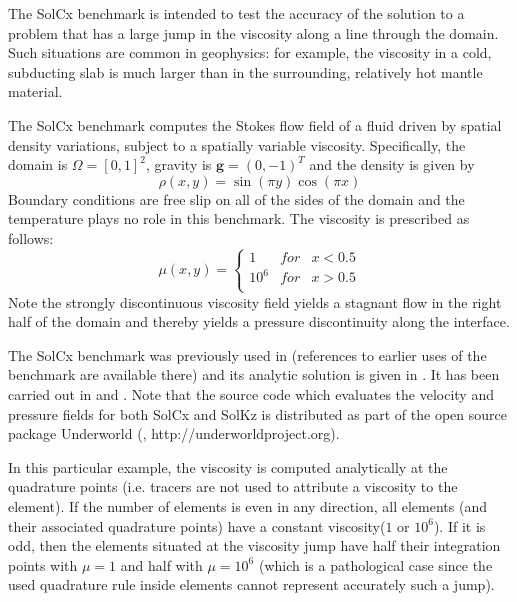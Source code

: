 

The SolCx benchmark is intended to test the accuracy of the solution to a problem that has a large jump in the viscosity along a line through the domain. Such situations are common in geophysics: for example, the viscosity in a cold, subducting slab is much larger than in the surrounding, relatively hot mantle material.

The SolCx benchmark computes the Stokes flow field of a fluid driven by spatial density variations, subject to a spatially variable viscosity. Specifically, the domain is $\Omega = [0,1]^2$, gravity is ${\bm g} = (0,-1)^T$ and the density is given by 
\begin{equation}
\rho(x,y) = \sin(\pi y) \cos(\pi x)
\end{equation}
Boundary conditions are free slip on all of the sides of the domain and the temperature plays no role in this benchmark. 
The viscosity is prescribed as follows:
\begin{equation}
\mu(x,y) = 
\left\{
\begin{array}{lll}
1 & for & x<0.5 \\
10^6 & for & x>0.5 \\
\end{array}
\right.
\end{equation}
Note the strongly discontinuous viscosity field yields a stagnant flow 
in the right half of the domain and thereby yields a pressure discontinuity along the interface. 

The SolCx benchmark was previously used in \cite{dumg11} (references to earlier uses of the benchmark are available there) and its analytic solution is given in \cite{zhon96}. It has been carried out in \cite{krhb12} and \cite{gemd13}. 
Note that the source code which evaluates the velocity and pressure fields for both SolCx and SolKz is 
distributed as part of the open source package Underworld (\cite{moql07}, http://underworldproject.org).

In this particular example, the viscosity is computed analytically at the quadrature points (i.e. tracers are 
not used to attribute a viscosity to the element). 
If the number of elements is even in any direction, all elements (and their associated quadrature points)
have a constant viscosity($1$ or  $10^6$). If it is odd, then the elements situated 
at the viscosity jump have half their integration points with $\mu=1$ and half with $\mu=10^6$ 
(which is a pathological case since the used quadrature rule inside elements cannot represent 
accurately such a jump).  


